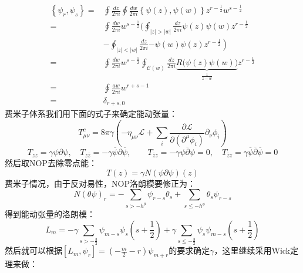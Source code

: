 \begin{equation}
	\begin{aligned}
		\left\{\psi_{r},\psi_{s}\right\}=&\oint\frac{dz}{2\pi i}\oint\frac{dw}{2\pi i}\left\{\psi(z),\psi(w)\right\}z^{r-\frac{1}{2}}w^{s-\frac{1}{2}} \\
		=&\oint\frac{dw}{2\pi i}w^{s-\frac12}\Big(\oint_{|z|>|w|}\frac{dz}{2\pi i}\psi(z)\psi(w)z^{r-\frac12} \\
		&-\oint_{|z|<|w|}\frac{dz}{2\pi i}\left.-\psi(w)\psi(z)z^{r-\frac12}\right) \\
		=&\oint\frac{dw}{2\pi i}w^{s-\frac12}\oint_{\mathcal{C}(w)}\frac{dz}{2\pi i}\underbrace{R\big(\psi(z)\psi(w)\big)}_{\frac{1}{z-w}}z^{r-\frac12} \\
		=&\oint\frac{aw}{2\pi i}w^{r+s-1} \\
		=&\delta_{r+s,0}
	\end{aligned}
\end{equation}
费米子体系我们用下面的式子来确定能动张量：
\begin{equation}
	T_{\mu\nu}^c=8\pi\left.\gamma\left(-\eta_{\mu\nu}\mathcal{L}+\sum_i\frac{\partial\mathcal{L}}{\partial\left(\partial^\mu\phi_i\right)}\partial_\nu\phi_i\right)\right. 
\end{equation}
\begin{equation}
	T_{zz}=\gamma\psi\partial\psi,\quad T_{z\overline{z}}=-\gamma\overline{\psi}\partial\overline{\psi},\quad\quad T_{\overline{z}z}=-\gamma\psi\overline{\partial}\psi=0,\quad T_{\overline{z}z}=\gamma\overline{\psi}\overline{\partial}\overline{\psi}=0
\end{equation}
然后取NOP去除零点能：
\begin{equation}
	T(z)=\gamma N\left(\psi\partial\psi\right)(z)
\end{equation}
费米子情况，由于反对易性，NOP洛朗模要修正为：
\begin{equation}
	\boxed{
		N\left(\theta\psi\right)_r=-\sum_{s>-h^\theta}\psi_{r-s}\theta_s+\sum_{s\leq-h^\phi}\theta_s\psi_{r-s}
	}
\end{equation}
得到能动张量的洛朗模：
\begin{equation}\label{35.49}
	L_m=-\gamma\sum_{s>-\frac32}\psi_{m-s}\psi_s\left(s+\frac12\right)+\gamma\sum_{s\leq-\frac32}\psi_s\psi_{m-s}\left(s+\frac12\right)
\end{equation}
然后就可以根据$\left[L_m,\psi_r\right]=\left(-\frac m2-r\right)\psi_{m+r}$的要求确定$\gamma$，这里继续采用Wick定理来做：
